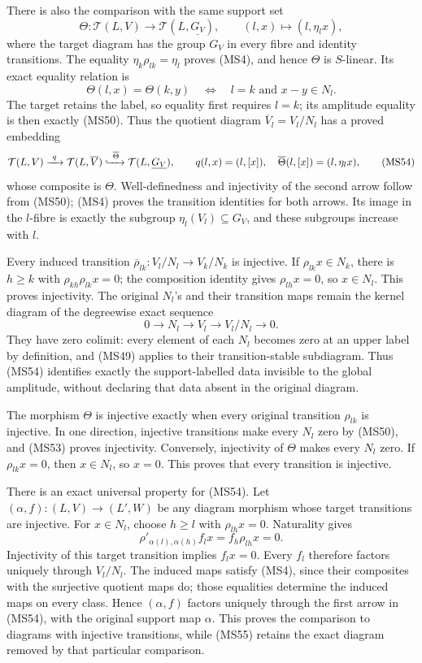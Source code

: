 \documentclass[
]{article}
\begin{document}
There is also the comparison with the same support set \[
\Theta:\mathcal T(L,V)\longrightarrow\mathcal T(L,\underline{G_V}),
\qquad (l,x)\longmapsto(l,\eta_lx),
\tag{MS52}
\] where the target diagram has the group \(G_V\) in every fibre and
identity transitions. The equality \(\eta_k\rho_{lk}=\eta_l\) proves
(MS4), and hence \(\Theta\) is \(S\)-linear. Its exact equality relation
is \[
\Theta(l,x)=\Theta(k,y)
\quad\Longleftrightarrow\quad
l=k\text{ and }x-y\in N_l.
\tag{MS53}
\] The target retains the label, so equality first requires \(l=k\); its
amplitude equality is then exactly (MS50). Thus the quotient diagram
\(\overline V_l=V_l/N_l\) has a proved embedding \[
\mathcal T(L,V)\xrightarrow{\ q\ }
\mathcal T(L,\overline V)
\xhookrightarrow{\ \overline\Theta\ }
\mathcal T(L,\underline{G_V}),
\qquad
q(l,x)=(l,[x]),\quad\overline\Theta(l,[x])=(l,\eta_lx),
\tag{MS54}
\] whose composite is \(\Theta\). Well-definedness and injectivity of
the second arrow follow from (MS50); (MS4) proves the transition
identities for both arrows. Its image in the \(l\)-fibre is exactly the
subgroup \(\eta_l(V_l)\subseteq G_V\), and these subgroups increase with
\(l\).

Every induced transition \(\overline\rho_{lk}:V_l/N_l\to V_k/N_k\) is
injective. If \(\rho_{lk}x\in N_k\), there is \(h\ge k\) with
\(\rho_{kh}\rho_{lk}x=0\); the composition identity gives
\(\rho_{lh}x=0\), so \(x\in N_l\). This proves injectivity. The original
\(N_l\)'s and their transition maps remain the kernel diagram of the
degreewise exact sequence \[
0\longrightarrow N_l\longrightarrow V_l\longrightarrow V_l/N_l\longrightarrow0.
\tag{MS55}
\] They have zero colimit: every element of each \(N_l\) becomes zero at
an upper label by definition, and (MS49) applies to their
transition-stable subdiagram. Thus (MS54) identifies exactly the
support-labelled data invisible to the global amplitude, without
declaring that data absent in the original diagram.

The morphism \(\Theta\) is injective exactly when every original
transition \(\rho_{lk}\) is injective. In one direction, injective
transitions make every \(N_l\) zero by (MS50), and (MS53) proves
injectivity. Conversely, injectivity of \(\Theta\) makes every \(N_l\)
zero. If \(\rho_{lk}x=0\), then \(x\in N_l\), so \(x=0\). This proves
that every transition is injective.

There is an exact universal property for (MS54). Let
\((\alpha,f):(L,V)\to(L',W)\) be any diagram morphism whose target
transitions are injective. For \(x\in N_l\), choose \(h\ge l\) with
\(\rho_{lh}x=0\). Naturality gives \[
\rho'_{\alpha(l),\alpha(h)}f_lx=f_h\rho_{lh}x=0.
\tag{MS56}
\] Injectivity of this target transition implies \(f_lx=0\). Every
\(f_l\) therefore factors uniquely through \(V_l/N_l\). The induced maps
satisfy (MS4), since their composites with the surjective quotient maps
do; those equalities determine the induced maps on every class. Hence
\((\alpha,f)\) factors uniquely through the first arrow in (MS54), with
the original support map \(\alpha\). This proves the comparison to
diagrams with injective transitions, while (MS55) retains the exact
diagram removed by that particular comparison.
\end{document}
